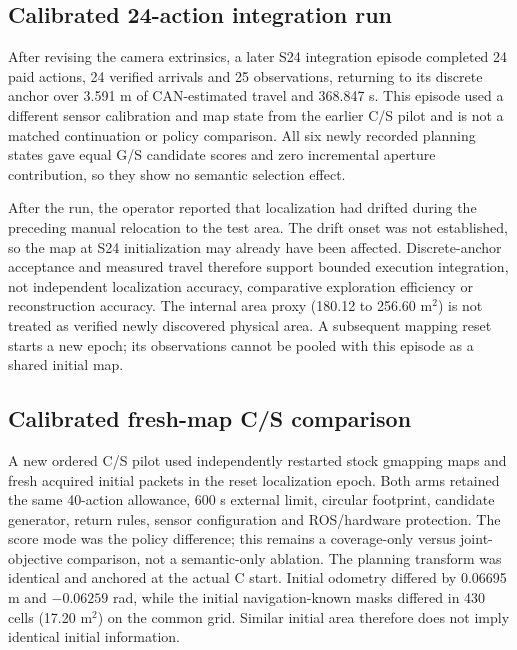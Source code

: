 \subsection{Calibrated 24-action integration run}

After revising the camera extrinsics, a later S24 integration episode completed 24 paid actions, 24 verified arrivals and 25 observations, returning to its discrete anchor over 3.591 m of CAN-estimated travel and 368.847 s. This episode used a different sensor calibration and map state from the earlier C/S pilot and is not a matched continuation or policy comparison. All six newly recorded planning states gave equal G/S candidate scores and zero incremental aperture contribution, so they show no semantic selection effect.

After the run, the operator reported that localization had drifted during the preceding manual relocation to the test area. The drift onset was not established, so the map at S24 initialization may already have been affected. Discrete-anchor acceptance and measured travel therefore support bounded execution integration, not independent localization accuracy, comparative exploration efficiency or reconstruction accuracy. The internal area proxy (180.12 to 256.60 m$^2$) is not treated as verified newly discovered physical area. A subsequent mapping reset starts a new epoch; its observations cannot be pooled with this episode as a shared initial map.

\subsection{Calibrated fresh-map C/S comparison}

A new ordered C/S pilot used independently restarted stock gmapping maps and fresh acquired initial packets in the reset localization epoch. Both arms retained the same 40-action allowance, 600 s external limit, circular footprint, candidate generator, return rules, sensor configuration and ROS/hardware protection. The score mode was the policy difference; this remains a coverage-only versus joint-objective comparison, not a semantic-only ablation. The planning transform was identical and anchored at the actual C start. Initial odometry differed by 0.06695 m and $-0.06259$ rad, while the initial navigation-known masks differed in 430 cells (17.20 m$^2$) on the common grid. Similar initial area therefore does not imply identical initial information.

